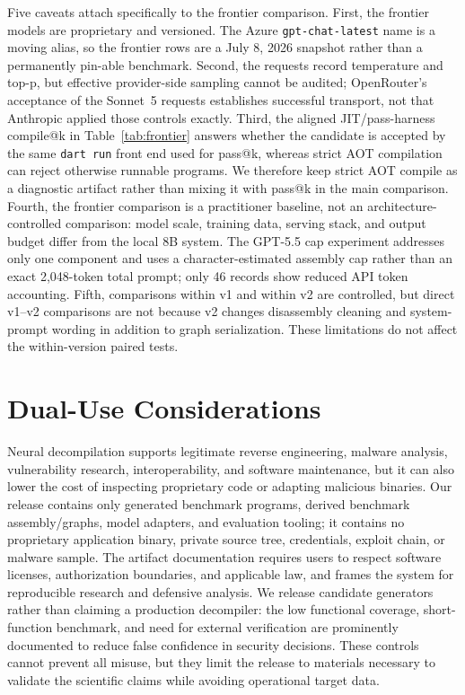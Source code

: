 \documentclass[11pt]{article}
\begin{document}
Five caveats attach specifically to the frontier comparison. First, the frontier models are proprietary and versioned. The Azure \texttt{gpt-chat-latest} name is a moving alias, so the frontier rows are a July 8, 2026 snapshot rather than a permanently pin-able benchmark. Second, the requests record temperature and top-p, but effective provider-side sampling cannot be audited; OpenRouter's acceptance of the Sonnet~5 requests establishes successful transport, not that Anthropic applied those controls exactly. Third, the aligned JIT/pass-harness compile@k in Table~\ref{tab:frontier} answers whether the candidate is accepted by the same \texttt{dart run} front end used for pass@k, whereas strict AOT compilation can reject otherwise runnable programs. We therefore keep strict AOT compile as a diagnostic artifact rather than mixing it with pass@k in the main comparison. Fourth, the frontier comparison is a practitioner baseline, not an architecture-controlled comparison: model scale, training data, serving stack, and output budget differ from the local 8B system. The GPT-5.5 cap experiment addresses only one component and uses a character-estimated assembly cap rather than an exact 2{,}048-token total prompt; only 46 records show reduced API token accounting. Fifth, comparisons within v1 and within v2 are controlled, but direct v1--v2 comparisons are not because v2 changes disassembly cleaning and system-prompt wording in addition to graph serialization. These limitations do not affect the within-version paired tests.

\section{Dual-Use Considerations}

Neural decompilation supports legitimate reverse engineering, malware analysis, vulnerability research, interoperability, and software maintenance, but it can also lower the cost of inspecting proprietary code or adapting malicious binaries. Our release contains only generated benchmark programs, derived benchmark assembly/graphs, model adapters, and evaluation tooling; it contains no proprietary application binary, private source tree, credentials, exploit chain, or malware sample. The artifact documentation requires users to respect software licenses, authorization boundaries, and applicable law, and frames the system for reproducible research and defensive analysis. We release candidate generators rather than claiming a production decompiler: the low functional coverage, short-function benchmark, and need for external verification are prominently documented to reduce false confidence in security decisions. These controls cannot prevent all misuse, but they limit the release to materials necessary to validate the scientific claims while avoiding operational target data.
\end{document}
